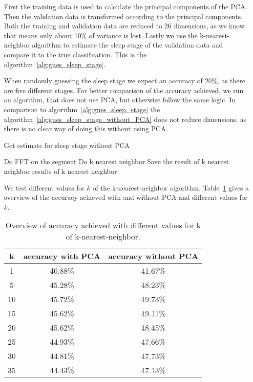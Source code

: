 First the training data is used to calculate the principal components of the PCA. Then the validation data is transformed according to the principal components. Both the training and validation data are reduced to 26 dimensions, as we know that means only about 10\% of variance is lost. Lastly we use the k-nearest-neighbor algorithm to estimate the sleep stage of the validation data and compare it to the true classification. This is the algorithm~\ref{alg:gues_sleep_stage}.

When randomly guessing the sleep stage we expect an accuracy of 20\%, as there are five different stages. For better comparison of the accuracy achieved, we run an algorithm, that does not use PCA, but otherwise follow the same logic. In comparison to algorithm~\ref{alg:gues_sleep_stage} the algorithm~\ref{alg:gues_sleep_stage_without_PCA} does not reduce dimensions, as there is no clear way of doing this without using PCA.

\begin{algorithm}
	\caption{Get estimate for sleep stage without PCA}\label{alg:gues_sleep_stage_without_PCA}
	\begin{algorithmic}
		\State Do FFT on the segment
		\State Do k nearest neighbor
		\State Save the result of k nearest neighbor
		\EndFor
		\State \Return results of k nearest neighbor
	\end{algorithmic}
\end{algorithm}

We test different values for $k$ of the k-nearest-neighbor algorithm. Table~\ref{tab:error_validation_overview} gives a overview of the accuracy achieved with and without PCA and different values for $k$.

\begin{table}
	\centering
	\begin{tabular}{c|c|c}
		k & accuracy with PCA & accuracy without PCA \\
		\hline
		1  & 40.88\% & 41.67\% \\
		5  & 45.28\% & 48.23\% \\
		10 & 45.72\% & 49.73\% \\
		15 & 45.62\% & 49.11\% \\
		20 & 45.62\% & 48.45\% \\
		25 & 44.93\% & 47.66\% \\
		30 & 44.81\% & 47.73\% \\
		35 & 44.43\% & 47.13\% \\
	\end{tabular}
	\caption{Overview of accuracy achieved with different values for k of k-nearest-neighbor.}
	\label{tab:error_validation_overview}
\end{table}

